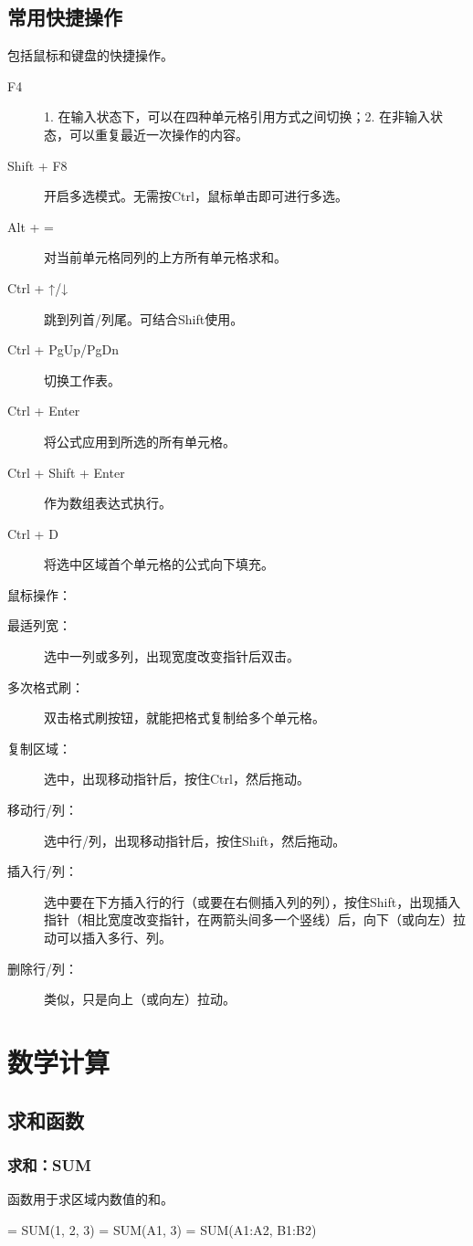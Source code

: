 \section{常用快捷操作}
包括鼠标和键盘的快捷操作。
\begin{description}
\item[F4] 1. 在输入状态下，可以在四种单元格引用方式之间切换；2. 在非输入状态，可以重复最近一次操作的内容。
\item[Shift + F8] 开启多选模式。无需按Ctrl，鼠标单击即可进行多选。
\item[Alt + =] 对当前单元格同列的上方所有单元格求和。
\item[Ctrl + ↑/↓] 跳到列首/列尾。可结合Shift使用。
\item[Ctrl + PgUp/PgDn] 切换工作表。
\item[Ctrl + Enter] 将公式应用到所选的所有单元格。
\item[Ctrl + Shift + Enter] 作为数组表达式执行。
\item[Ctrl + D] 将选中区域首个单元格的公式向下填充。
\end{description}

\vspace*{1ex}鼠标操作：
\begin{description}
\item[最适列宽：] 选中一列或多列，出现宽度改变指针后双击。
\item[多次格式刷：] 双击格式刷按钮，就能把格式复制给多个单元格。
\item[复制区域：] 选中，出现移动指针后，按住Ctrl，然后拖动。
\item[移动行/列：] 选中行/列，出现移动指针后，按住Shift，然后拖动。
\item[插入行/列：] 选中要在下方插入行的行（或要在右侧插入列的列），按住Shift，出现插入指针（相比宽度改变指针，在两箭头间多一个竖线）后，向下（或向左）拉动可以插入多行、列。
\item[删除行/列：] 类似，只是向上（或向左）拉动。
\end{description}

\chapter{数学计算}
\section{求和函数}
\subsection{求和：SUM}
函数用于求区域内数值的和。
\begin{excode}
= SUM(1, 2, 3)   
= SUM(A1, 3)
= SUM(A1:A2, B1:B2)
\end{excode}

